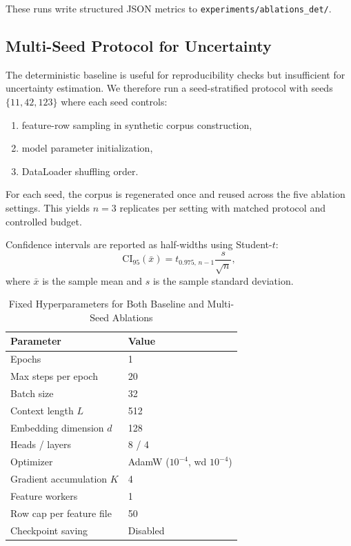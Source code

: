 \documentclass[conference]{IEEEtran}
\begin{document}
These runs write structured JSON metrics to \texttt{experiments/ablations\_det/}.

\subsection{Multi-Seed Protocol for Uncertainty}
The deterministic baseline is useful for reproducibility checks but insufficient for uncertainty estimation. We therefore run a seed-stratified protocol with seeds $\{11,42,123\}$ where each seed controls:
\begin{enumerate}
    \item feature-row sampling in synthetic corpus construction,
    \item model parameter initialization,
    \item DataLoader shuffling order.
\end{enumerate}

For each seed, the corpus is regenerated once and reused across the five ablation settings. This yields $n=3$ replicates per setting with matched protocol and controlled budget.

Confidence intervals are reported as half-widths using Student-$t$:
\begin{equation}
\mathrm{CI}_{95}(\bar{x}) = t_{0.975,\,n-1}\frac{s}{\sqrt{n}},
\label{eq:ci95}
\end{equation}
where $\bar{x}$ is the sample mean and $s$ is the sample standard deviation.

\begin{table}[t]
\caption{Fixed Hyperparameters for Both Baseline and Multi-Seed Ablations}
\label{tab:fixed_hparams}
\centering
\begin{tabular}{ll}
\toprule
Parameter & Value \\
\midrule
Epochs & 1 \\
Max steps per epoch & 20 \\
Batch size & 32 \\
Context length $L$ & 512 \\
Embedding dimension $d$ & 128 \\
Heads / layers & 8 / 4 \\
Optimizer & AdamW ($10^{-4}$, wd $10^{-4}$) \\
Gradient accumulation $K$ & 4 \\
Feature workers & 1 \\
Row cap per feature file & 50 \\
Checkpoint saving & Disabled \\
\bottomrule
\end{tabular}
\end{table}
\end{document}

